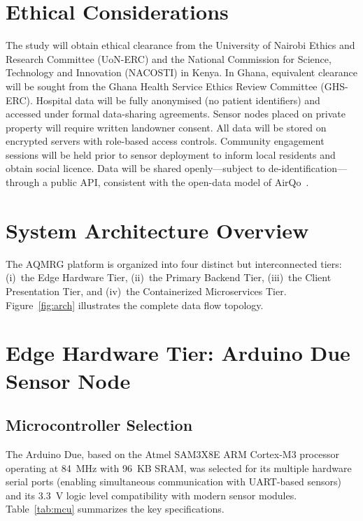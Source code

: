 \section{Ethical Considerations}
The study will obtain ethical clearance from the University of Nairobi Ethics and Research Committee (UoN-ERC) and the National Commission for Science, Technology and Innovation (NACOSTI) in Kenya. In Ghana, equivalent clearance will be sought from the Ghana Health Service Ethics Review Committee (GHS-ERC). Hospital data will be fully anonymised (no patient identifiers) and accessed under formal data-sharing agreements. Sensor nodes placed on private property will require written landowner consent. All data will be stored on encrypted servers with role-based access controls. Community engagement sessions will be held prior to sensor deployment to inform local residents and obtain social licence. Data will be shared openly—subject to de-identification—through a public API, consistent with the open-data model of AirQo~\cite{bainomugisha2024}.


\section{System Architecture Overview}

The AQMRG platform is organized into four distinct but interconnected tiers: (i)~the Edge Hardware Tier, (ii)~the Primary Backend Tier, (iii)~the Client Presentation Tier, and (iv)~the Containerized Microservices Tier. Figure~\ref{fig:arch} illustrates the complete data flow topology.

\figMethodologyArch

\figMethodologyLifecycle

\figMethodologyDeploy

\section{Edge Hardware Tier: Arduino Due Sensor Node}

\subsection{Microcontroller Selection}
The Arduino Due, based on the Atmel SAM3X8E ARM Cortex-M3 processor operating at 84~MHz with 96~KB SRAM, was selected for its multiple hardware serial ports (enabling simultaneous communication with UART-based sensors) and its 3.3~V logic level compatibility with modern sensor modules. Table~\ref{tab:mcu} summarizes the key specifications.

